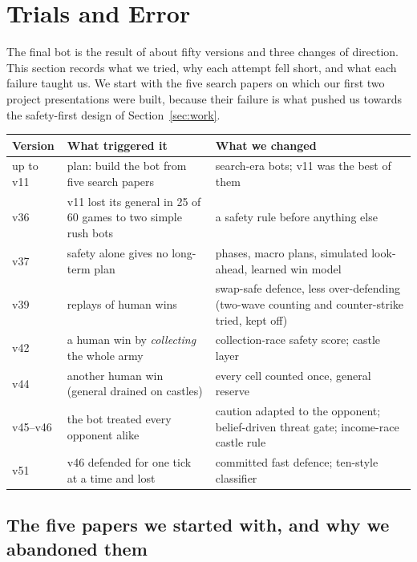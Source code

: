 \section{Trials and Error}\label{sec:trials}

The final bot is the result of about fifty versions and three changes of direction. This section records what
we tried, why each attempt fell short, and what each failure taught us. We start with the five search papers on
which our first two project presentations were built, because their failure is what pushed us towards the
safety-first design of Section~\ref{sec:work}.

\begin{center}
\small
\begin{tabularx}{\linewidth}{>{\raggedright}p{1.4cm}>{\raggedright}p{5.2cm}X}
\toprule
\textbf{Version} & \textbf{What triggered it} & \textbf{What we changed}\\
\midrule
up to v11 & plan: build the bot from five search papers & search-era bots; v11 was the best of them\\
v36 & v11 lost its general in 25 of 60 games to two simple rush bots & a safety rule before anything else\\
v37 & safety alone gives no long-term plan & phases, macro plans, simulated look-ahead, learned win model\\
v39 & replays of human wins & swap-safe defence, less over-defending (two-wave counting and counter-strike tried, kept off)\\
v42 & a human win by \emph{collecting} the whole army & collection-race safety score; castle layer\\
v44 & another human win (general drained on castles) & every cell counted once, general reserve\\
v45--v46 & the bot treated every opponent alike & caution adapted to the opponent; belief-driven threat gate; income-race castle rule\\
v51 & v46 defended for one tick at a time and lost & committed fast defence; ten-style classifier\\
\bottomrule
\end{tabularx}
\end{center}

\subsection{The five papers we started with, and why we abandoned them}

